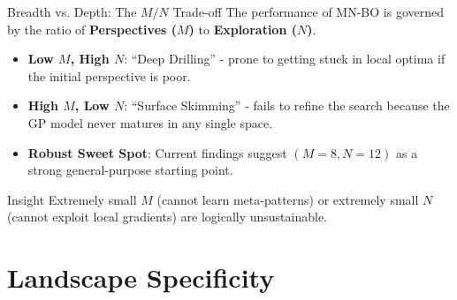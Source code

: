 \documentclass[10pt, aspectratio=169]{beamer}
\begin{document}
\begin{frame}{Breadth vs. Depth: The $M/N$ Trade-off}
    The performance of MN-BO is governed by the ratio of \textbf{Perspectives ($M$)} to \textbf{Exploration ($N$)}.
    
    \begin{itemize}
        \item \textbf{Low $M$, High $N$}: ``Deep Drilling'' - prone to getting stuck in local optima if the initial perspective is poor.
        \item \textbf{High $M$, Low $N$}: ``Surface Skimming'' - fails to refine the search because the GP model never matures in any single space.
        \item \textbf{Robust Sweet Spot}: Current findings suggest $(M=8, N=12)$ as a strong general-purpose starting point.
    \end{itemize}
    
    \begin{block}{Insight}
        Extremely small $M$ (cannot learn meta-patterns) or extremely small $N$ (cannot exploit local gradients) are logically unsustainable.
    \end{block}
\end{frame}

\section{Landscape Specificity}
\end{document}
